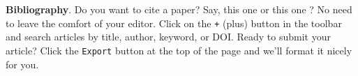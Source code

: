 \textbf{Bibliography}. Do you want to cite a paper? Say, this one \cite{2012} or this one \cite{Holstein_2009}? No need to leave the comfort of your editor. Click on the \verb|+| (plus) button in the toolbar and search articles by title, author, keyword, or DOI. Ready to submit your article? Click the \verb|Export| button at the top of the page and we'll format it nicely for you.